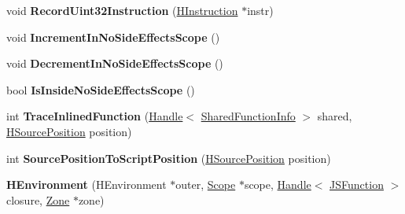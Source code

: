 \begin{DoxyCompactItemize}
\item 
\hypertarget{classv8_1_1internal_1_1_v8___f_i_n_a_l_a8385bf68ed9a969bb6ce8998c499801d}{}void {\bfseries Record\+Uint32\+Instruction} (\hyperlink{classv8_1_1internal_1_1_h_instruction}{H\+Instruction} $\ast$instr)\label{classv8_1_1internal_1_1_v8___f_i_n_a_l_a8385bf68ed9a969bb6ce8998c499801d}

\item 
\hypertarget{classv8_1_1internal_1_1_v8___f_i_n_a_l_a5e9542d323adebd2ad3b658b830946c9}{}void {\bfseries Increment\+In\+No\+Side\+Effects\+Scope} ()\label{classv8_1_1internal_1_1_v8___f_i_n_a_l_a5e9542d323adebd2ad3b658b830946c9}

\item 
\hypertarget{classv8_1_1internal_1_1_v8___f_i_n_a_l_ac8c22ee07c48ec0967123aed41aba69e}{}void {\bfseries Decrement\+In\+No\+Side\+Effects\+Scope} ()\label{classv8_1_1internal_1_1_v8___f_i_n_a_l_ac8c22ee07c48ec0967123aed41aba69e}

\item 
\hypertarget{classv8_1_1internal_1_1_v8___f_i_n_a_l_a86da46f60a58853d4c27ee75ea465548}{}bool {\bfseries Is\+Inside\+No\+Side\+Effects\+Scope} ()\label{classv8_1_1internal_1_1_v8___f_i_n_a_l_a86da46f60a58853d4c27ee75ea465548}

\item 
\hypertarget{classv8_1_1internal_1_1_v8___f_i_n_a_l_aafef3e8be63e8ff3d33126d61f841cde}{}int {\bfseries Trace\+Inlined\+Function} (\hyperlink{classv8_1_1internal_1_1_handle}{Handle}$<$ \hyperlink{classv8_1_1internal_1_1_shared_function_info}{Shared\+Function\+Info} $>$ shared, \hyperlink{classv8_1_1internal_1_1_h_source_position}{H\+Source\+Position} position)\label{classv8_1_1internal_1_1_v8___f_i_n_a_l_aafef3e8be63e8ff3d33126d61f841cde}

\item 
\hypertarget{classv8_1_1internal_1_1_v8___f_i_n_a_l_a75986815b07612788c67a9810722fe15}{}int {\bfseries Source\+Position\+To\+Script\+Position} (\hyperlink{classv8_1_1internal_1_1_h_source_position}{H\+Source\+Position} position)\label{classv8_1_1internal_1_1_v8___f_i_n_a_l_a75986815b07612788c67a9810722fe15}

\item 
\hypertarget{classv8_1_1internal_1_1_v8___f_i_n_a_l_a3f667a58916f232133ce6e7bdfa19a24}{}{\bfseries H\+Environment} (H\+Environment $\ast$outer, \hyperlink{classv8_1_1internal_1_1_v8___f_i_n_a_l_1_1_scope}{Scope} $\ast$scope, \hyperlink{classv8_1_1internal_1_1_handle}{Handle}$<$ \hyperlink{classv8_1_1internal_1_1_j_s_function}{J\+S\+Function} $>$ closure, \hyperlink{classv8_1_1internal_1_1_zone}{Zone} $\ast$zone)\label{classv8_1_1internal_1_1_v8___f_i_n_a_l_a3f667a58916f232133ce6e7bdfa19a24}


\end{DoxyCompactItemize}
